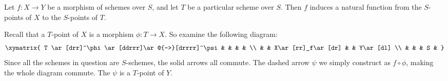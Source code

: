 \documentclass[12pt]{article}
\begin{document}
Let $f\colon X\to Y$ be a morphism of schemes over $S$, and let $T$ be a particular scheme over $S$.  Then $f$ induces a natural function from the $S$-points of $X$ to the $S$-points of $T$. 

Recall that a $T$-point of $X$ is a morphism $\phi\colon T\to X$.  So examine the following diagram:
\[
\xymatrix{
T \ar[drr]^\phi\ar[ddrrr]\ar@{-->}[drrrr]^\psi & &   &   &   \\
  & & X\ar[rr]_f\ar[dr] &   & Y\ar[dl] \\
  & &   & S & 
}
\]
Since all the schemes in question are $S$-schemes, the solid arrows all commute.  The dashed arrow $\psi$ we simply construct as $f\circ\phi$, making the whole diagram commute.  The $\psi$ is a $T$-point of $Y$.
\end{document}
